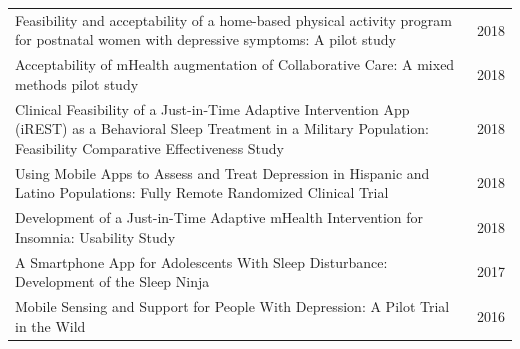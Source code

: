 \begin{longtable}{@{}p{} r@{}}
Feasibility and acceptability of a home-based physical activity program for postnatal women with depressive symptoms: A pilot study~\cite{teychenne2018postnatalactivity} & 2018 \\
Acceptability of mHealth augmentation of Collaborative Care: A mixed methods pilot study~\cite{bauer2018mhealthcollaborative} & 2018 \\
Clinical Feasibility of a Just-in-Time Adaptive Intervention App (iREST) as a Behavioral Sleep Treatment in a Military Population: Feasibility Comparative Effectiveness Study~\cite{pulantara2018irest} & 2018 \\
Using Mobile Apps to Assess and Treat Depression in Hispanic and Latino Populations: Fully Remote Randomized Clinical Trial~\cite{pratap2018hispanic} & 2018 \\
Development of a Just-in-Time Adaptive mHealth Intervention for Insomnia: Usability Study~\cite{pulantara2018insomnia} & 2018 \\
A Smartphone App for Adolescents With Sleep Disturbance: Development of the Sleep Ninja~\cite{werner-seidler2017sleepninja} & 2017 \\
Mobile Sensing and Support for People With Depression: A Pilot Trial in the Wild~\cite{wahle2016mobilesensing} & 2016 \\
\end{longtable}
